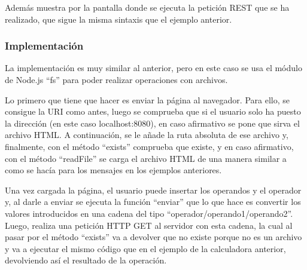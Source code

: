 \documentclass{article}
\begin{document}
Además muestra por la pantalla donde se ejecuta la petición REST que se ha realizado, que sigue la misma sintaxis que el ejemplo anterior.

\subsubsection{Implementación}
La implementación es muy similar al anterior, pero en este caso se usa el módulo de Node.js ``fs'' para poder realizar operaciones con archivos.

Lo primero que tiene que hacer es enviar la página al navegador. Para ello, se consigue la URI como antes, luego se comprueba que si el usuario solo ha puesto la dirección (en este caso localhost:8080), en caso afirmativo se pone que sirva el archivo HTML. A continuación, se le añade la ruta absoluta de ese archivo y, finalmente, con el método ``exists'' comprueba que existe, y en caso afirmativo, con el método ``readFile'' se carga el archivo HTML de una manera similar a como se hacía para los mensajes en los ejemplos anteriores.

Una vez cargada la página, el usuario puede insertar los operandos y el operador y, al darle a enviar se ejecuta la función ``enviar'' que lo que hace es convertir los valores introducidos en una cadena del tipo ``operador/operando1/operando2''. Luego, realiza una petición HTTP GET al servidor con esta cadena, la cual al pasar por el método ``exists'' va a devolver que no existe porque no es un archivo y va a ejecutar el mismo código que en el ejemplo de la calculadora anterior, devolviendo así el resultado de la operación.
\end{document}
